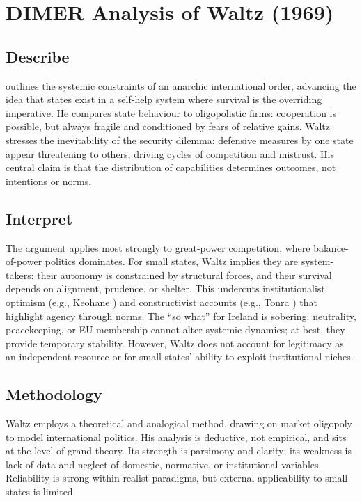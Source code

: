 \documentclass[12pt,a4paper]{article}
\begin{document}
\section*{DIMER Analysis of Waltz (1969)}

\subsection*{Describe}
\textcite{WALTZ_1969} outlines the systemic constraints of an anarchic international order, advancing the idea that states exist in a self-help system where survival is the overriding imperative. He compares state behaviour to oligopolistic firms: cooperation is possible, but always fragile and conditioned by fears of relative gains. Waltz stresses the inevitability of the security dilemma: defensive measures by one state appear threatening to others, driving cycles of competition and mistrust. His central claim is that the distribution of capabilities determines outcomes, not intentions or norms.

\subsection*{Interpret}
The argument applies most strongly to great-power competition, where balance-of-power politics dominates. For small states, Waltz implies they are system-takers: their autonomy is constrained by structural forces, and their survival depends on alignment, prudence, or shelter. This undercuts institutionalist optimism (e.g., Keohane \parencite{KEOHANE_1969}) and constructivist accounts (e.g., Tonra \parencite{TONRA_1999}) that highlight agency through norms. The “so what” for Ireland is sobering: neutrality, peacekeeping, or EU membership cannot alter systemic dynamics; at best, they provide temporary stability. However, Waltz does not account for legitimacy as an independent resource or for small states’ ability to exploit institutional niches.

\subsection*{Methodology}
Waltz employs a theoretical and analogical method, drawing on market oligopoly to model international politics. His analysis is deductive, not empirical, and sits at the level of grand theory. Its strength is parsimony and clarity; its weakness is lack of data and neglect of domestic, normative, or institutional variables. Reliability is strong within realist paradigms, but external applicability to small states is limited.
\end{document}
